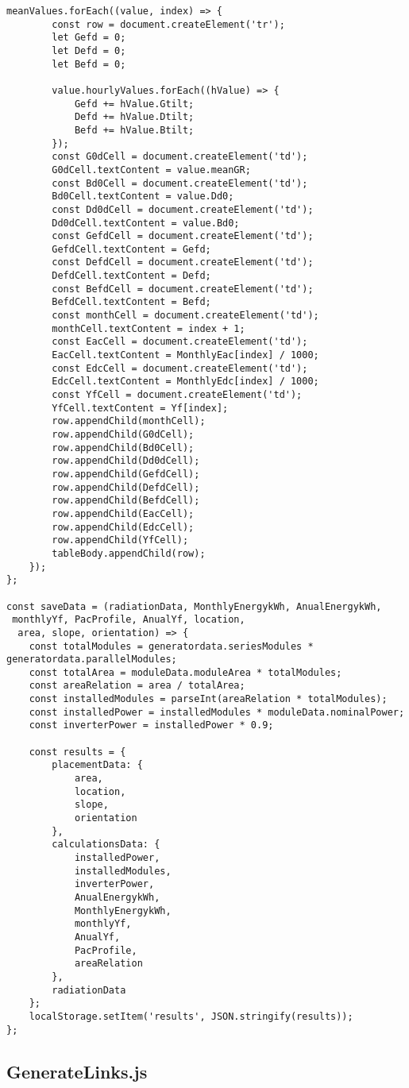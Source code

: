 \begin{lstlisting}[style=ES6, caption={public/scripts/DataAquisition.js}]
	meanValues.forEach((value, index) => {
		const row = document.createElement('tr');
		let Gefd = 0;
		let Defd = 0;
		let Befd = 0;

		value.hourlyValues.forEach((hValue) => {
			Gefd += hValue.Gtilt;
			Defd += hValue.Dtilt;
			Befd += hValue.Btilt;
		});
		const G0dCell = document.createElement('td');
		G0dCell.textContent = value.meanGR;
		const Bd0Cell = document.createElement('td');
		Bd0Cell.textContent = value.Dd0;
		const Dd0dCell = document.createElement('td');
		Dd0dCell.textContent = value.Bd0;
		const GefdCell = document.createElement('td');
		GefdCell.textContent = Gefd;
		const DefdCell = document.createElement('td');
		DefdCell.textContent = Defd;
		const BefdCell = document.createElement('td');
		BefdCell.textContent = Befd;
		const monthCell = document.createElement('td');
		monthCell.textContent = index + 1;
		const EacCell = document.createElement('td');
		EacCell.textContent = MonthlyEac[index] / 1000;
		const EdcCell = document.createElement('td');
		EdcCell.textContent = MonthlyEdc[index] / 1000;
		const YfCell = document.createElement('td');
		YfCell.textContent = Yf[index];
		row.appendChild(monthCell);
		row.appendChild(G0dCell);
		row.appendChild(Bd0Cell);
		row.appendChild(Dd0dCell);
		row.appendChild(GefdCell);
		row.appendChild(DefdCell);
		row.appendChild(BefdCell);
		row.appendChild(EacCell);
		row.appendChild(EdcCell);
		row.appendChild(YfCell);
		tableBody.appendChild(row);
	});
};

const saveData = (radiationData, MonthlyEnergykWh, AnualEnergykWh,
 monthlyYf, PacProfile, AnualYf, location,
  area, slope, orientation) => {
	const totalModules = generatordata.seriesModules * generatordata.parallelModules;
	const totalArea = moduleData.moduleArea * totalModules;
	const areaRelation = area / totalArea;
	const installedModules = parseInt(areaRelation * totalModules);
	const installedPower = installedModules * moduleData.nominalPower;
	const inverterPower = installedPower * 0.9;

	const results = {
		placementData: {
			area,
			location,
			slope,
			orientation
		},
		calculationsData: {
			installedPower,
			installedModules,
			inverterPower,
			AnualEnergykWh,
			MonthlyEnergykWh,
			monthlyYf,
			AnualYf,
			PacProfile,
			areaRelation
		},
		radiationData
	};
	localStorage.setItem('results', JSON.stringify(results));
};

\end{lstlisting}

\subsection{GenerateLinks.js}

